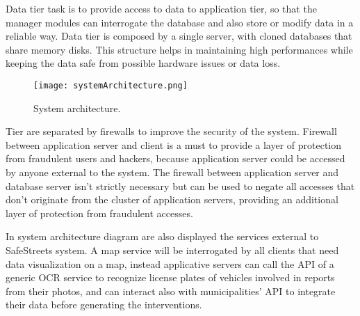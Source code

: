 Data tier task is to provide access to data to application tier, so that the manager modules can interrogate the database and also store or modify data in a reliable way. Data tier is composed by a single server, with cloned databases that share memory disks. This structure helps in maintaining high performances while keeping the data safe from possible hardware issues or data loss.

\begin{figure}[H]
	\centering
	\texttt{[image: systemArchitecture.png]}
	\caption{System architecture.}
\end{figure}

Tier are separated by firewalls to improve the security of the system. Firewall between application server and client is a must to provide a layer of protection from fraudulent users and hackers, because application server could be accessed by anyone external to the system. The firewall between application server and database server isn't strictly necessary but can be used to negate all accesses that don't originate from the cluster of application servers, providing an additional layer of protection from fraudulent accesses.

In system architecture diagram are also displayed the services external to SafeStreets system. A map service will be interrogated by all clients that need data visualization on a map, instead applicative servers can call the API of a generic OCR service to recognize license plates of vehicles involved in reports from their photos, and can interact also with municipalities' API to integrate their data before generating the interventions. 